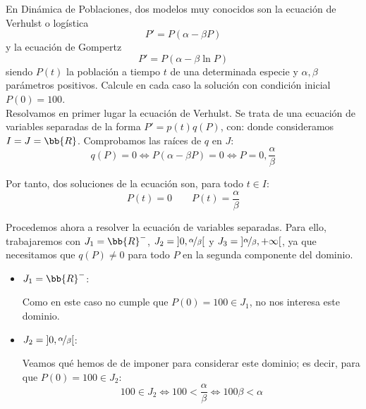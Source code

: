\begin{ejercicio}
    En Dinámica de Poblaciones, dos modelos muy conocidos son la ecuación de Verhulst o logística
    \begin{equation*}
        P' = P(\alpha - \beta P)
    \end{equation*}
    y la ecuación de Gompertz
    \begin{equation*}
        P' = P(\alpha - \beta \ln P)
    \end{equation*}
    siendo $P(t)$ la población a tiempo $t$ de una determinada especie y $\alpha, \beta$ parámetros positivos. Calcule en cada caso la solución con condición inicial $P(0) = 100$.\\

    Resolvamos en primer lugar la ecuación de Verhulst. Se trata de una ecuación de variables separadas de la forma $P' = p(t)q(P)$, con:
    donde consideramos $I=J=\bb{R}$. Comprobamos las raíces de $q$ en $J$:
    \begin{equation*}
        q(P) = 0 \Longleftrightarrow P(\alpha - \beta P) = 0 \Longleftrightarrow P=0, \dfrac{\alpha}{\beta}
    \end{equation*}

    Por tanto, dos soluciones de la ecuación son, para todo $t\in I$:
    \begin{equation*}
        P(t) = 0 \qquad P(t) = \dfrac{\alpha}{\beta}
    \end{equation*}

    Procedemos ahora a resolver la ecuación de variables separadas. Para ello, trabajaremos con $J_1=\bb{R}^-$, $J_2=\left]0, \nicefrac{\alpha}{\beta}\right[$ y $J_3=\left]\nicefrac{\alpha}{\beta}, +\infty\right[$,
    ya que necesitamos que $q(P)\neq 0$ para todo $P$ en la segunda componente del dominio.
    \begin{itemize}
        \item \ul{$J_1=\bb{R}^-$}:
        
        Como en este caso no cumple que $P(0)=100\in J_1$, no nos interesa este dominio.

        \item \ul{$J_2=\left]0, \nicefrac{\alpha}{\beta}\right[$}:
        
        Veamos qué hemos de de imponer para considerar este dominio; es decir, para que $P(0)=100\in J_2$:
        \begin{equation*}
            100\in J_2 \Longleftrightarrow 100<\dfrac{\alpha}{\beta} \Longleftrightarrow 100\beta<\alpha
        \end{equation*}
        

\end{itemize}
\end{ejercicio}
